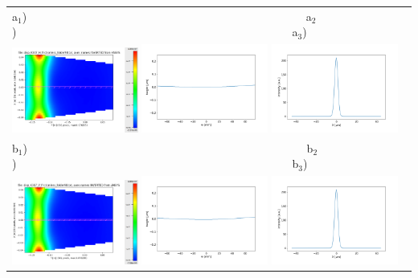 \documentclass[aps,pra,showpacs,twocolumn,amsmath,amssymb,superscriptaddress,nofootinbib]{revtex4}
\begin{document}
  

\thispagestyle{empty}


  \begin{center}
   \begin{tabular}{l}
   a$_1$)~~~~~~~~~~~~~~~~~~~~~~~~~~~~~~~~~~~~~~~~~~~~~~~~~
   a$_2$)~~~~~~~~~~~~~~~~~~~~~~~~~~~~~~~~~~~~~~~~~~~~~~~~~a$_3$)\\
   \includegraphics[width=0.32\textwidth]{figures/cryogenic2d.png}
   \includegraphics[width=0.32\textwidth]{figures/deformation1.png}
   \includegraphics[width=0.32\textwidth]{figures/intensity1.png} \\

  b$_1$)~~~~~~~~~~~~~~~~~~~~~~~~~~~~~~~~~~~~~~~~~~~~~~~~~
  b$_2$)~~~~~~~~~~~~~~~~~~~~~~~~~~~~~~~~~~~~~~~~~~~~~~~~~b$_3$)\\
  \includegraphics[width=0.32\textwidth]{figures/cryogenic2dKh.png}
  \includegraphics[width=0.32\textwidth]{figures/deformation2.png}
  \includegraphics[width=0.32\textwidth]{figures/intensity2.png} \\


\end{tabular}
\end{center}
\end{document}
